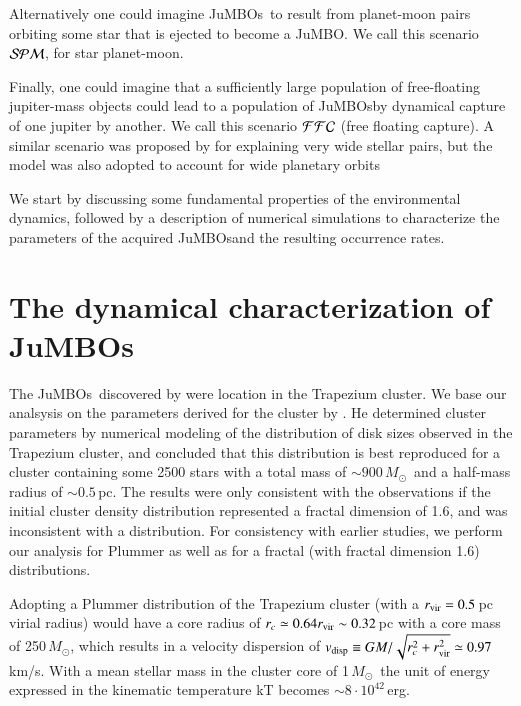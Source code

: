 \documentclass[aa]{lib/aa}
\newcommand{\MSun}{\mbox{${M}_\odot$}}
\newcommand{\jumbo}{\mbox{JuMBO}}
\newcommand{\jumbos}{\mbox{JuMBOs}}
\begin{document}
Alternatively one could imagine \jumbos\, to result from planet-moon
pairs orbiting some star that is ejected to become a \jumbo.  We call
this scenario ${\cal SPM}$, for star planet-moon.

Finally, one could imagine that a sufficiently large population of
free-floating jupiter-mass objects could lead to a population of
\jumbos by dynamical capture of one jupiter by another.  We call this
scenario ${\cal FFC}$ (free floating capture). A similar scenario was
proposed by \cite{2010MNRAS.404.1835K} for explaining very wide
stellar pairs, but the model was also adopted to account for wide
planetary orbits \citep{2012ApJ...750...83P,2018MNRAS.473.1589G}

We start by discussing some fundamental properties of the
environmental dynamics, followed by a description of numerical
simulations to characterize the parameters of the acquired \jumbos and
the resulting occurrence rates. 

\section{The dynamical characterization of \jumbos}

The \jumbos\, discovered by \cite{2023arXiv231001231P} were location
in the Trapezium cluster. We base our analsysis on the parameters
derived for the cluster by \cite{2016MNRAS.457..313P}.  He determined
cluster parameters by numerical modeling of the distribution of disk
sizes observed in the Trapezium cluster, and concluded that this
distribution is best reproduced for a cluster containing some 2500
stars with a total mass of $\sim 900$\,\MSun\, and a half-mass radius
of $\sim 0.5$\,pc. The results were only consistent with the
observations if the initial cluster density distribution represented a
fractal dimension of 1.6, and was inconsistent with a
\cite{1911MNRAS..71..460P} distribution.  For consistency with earlier
studies, we perform our analysis for Plummer as well as for a fractal
(with fractal dimension 1.6) distributions.

Adopting a Plummer distribution of the Trapezium cluster (with a
$r_{\rm vir} = 0.5$\,pc virial radius) would have a core radius of
$r_c \simeq 0.64r_{\rm vir} \sim 0.32$\,pc with a core mass of
250\,\MSun, which results in a velocity dispersion of $v_{\rm disp}
\equiv GM/\sqrt{r_c^2 + r_{\rm vir}^2} \simeq 0.97$\,km/s. With a
mean stellar mass in the cluster core of 1\,\MSun\, the unit of energy
expressed in the kinematic temperature kT becomes $\sim 8 \cdot
10^{42}$\,erg.
\end{document}

